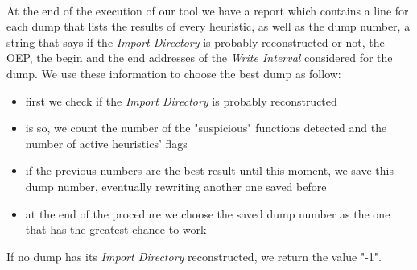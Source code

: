 \paragraph{}
At the end of the execution of our tool we have a report which contains a line for each dump that lists the results of every heuristic, as well as the dump number, a string that says if the \textit{Import Directory} is probably reconstructed or not, the \ac{OEP}, the begin and the end addresses of the \textit{Write Interval} considered for the dump. We use these information to choose the best dump as follow:
\begin{itemize}
\item first we check if the \textit{Import Directory} is probably reconstructed
\item is so, we count the number of the "suspicious" functions detected and the number of active heuristics' flags
\item if the previous numbers are the best result until this moment, we save this dump number, eventually rewriting another one saved before
\item at the end of the procedure we choose the saved dump number as the one that has the greatest chance to work
\end{itemize}
If no dump has its \textit{Import Directory} reconstructed, we return the value "-1".